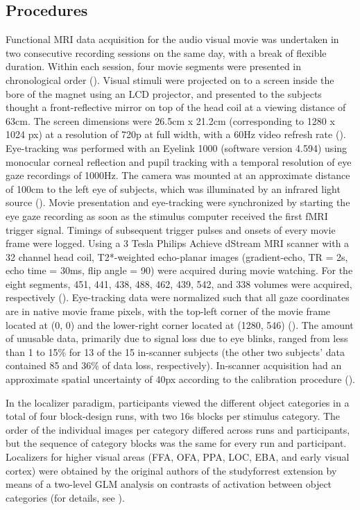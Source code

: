 \documentclass[a4paper, 12pt]{scrreprt}
\begin{document}
\subsection{Procedures}
Functional MRI data acquisition for the audio visual movie was undertaken in two consecutive recording sessions on the same day, with a break of flexible duration. Within each session, four movie segments were presented in chronological order (\cite{hanke2016studyforrest}). Visual stimuli were projected on to a screen inside the bore of the magnet using an LCD projector, and presented to the subjects thought a front-reflective mirror on top of the head coil at a viewing distance of 63cm. The screen dimensions were 26.5cm x 21.2cm (corresponding to 1280 x 1024 px) at a resolution of 720p at full width, with a 60Hz video refresh rate (\cite{sengupta2016studyforrest}). Eye-tracking was performed with an Eyelink 1000 (software version 4.594) using monocular corneal reflection and pupil tracking with a temporal resolution of eye gaze recordings of 1000Hz. The camera was mounted at an approximate distance of 100cm to the left eye of subjects, which was illuminated by an infrared light source (\cite{hanke2016studyforrest}). Movie presentation and eye-tracking were synchronized by starting the eye gaze recording as soon as the stimulus computer received the first fMRI trigger signal. Timings of subsequent trigger pulses and onsets of every movie frame were logged. Using a 3 Tesla Philips Achieve dStream MRI scanner with a 32 channel head coil, T2*-weighted echo-planar images (gradient-echo, TR = 2s, echo time = 30ms, flip angle = 90) were acquired during movie watching. For the eight segments, 451, 441, 438, 488, 462, 439, 542, and 338 volumes were acquired, respectively (\cite{hanke2016studyforrest}). Eye-tracking data were normalized such that all gaze coordinates are in native movie frame pixels, with the top-left corner of the movie frame located at (0, 0) and the lower-right corner located at (1280, 546) (\cite{hanke2016studyforrest}). The amount of unusable data, primarily due to signal loss due to eye blinks, ranged from less than 1 to 15\% for 13 of the 15 in-scanner subjects (the other two subjects’ data contained 85 and 36\% of data loss, respectively). In-scanner acquisition had an approximate spatial uncertainty of 40px according to the calibration procedure (\cite{hanke2016studyforrest}).\newline

In the localizer paradigm, participants viewed the different object categories in a total of four block-design runs, with two 16s blocks per stimulus category. The order of the individual images per category differed across runs and participants, but the sequence of category blocks was the same for every run and participant. Localizers for higher visual areas (FFA, OFA, PPA, LOC, EBA, and early visual cortex) were obtained by the original authors of the studyforrest extension by means of a two-level GLM analysis on contrasts of activation between object categories (for details, see \cite{sengupta2016studyforrest}).
\end{document}
